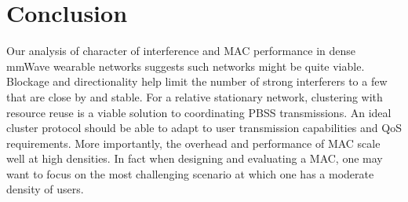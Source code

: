 \documentclass[10pt, conference, letterpaper]{IEEEtran}
\begin{document}
\section{Conclusion}\label{section:conclusion}	
Our analysis of character of interference and MAC performance in dense mmWave wearable networks suggests such networks might be quite viable. 
Blockage and directionality help limit the number of strong interferers to a few that are close by and stable.
For a relative stationary network, clustering with resource reuse is a viable solution to coordinating PBSS transmissions. 
An ideal cluster protocol should be able to adapt to user transmission capabilities and QoS requirements. %
More importantly, the overhead and performance of MAC scale well at high densities. 
In fact when designing and evaluating a MAC, one may want to focus on the most challenging scenario at which one has a moderate density of users.
\end{document}
